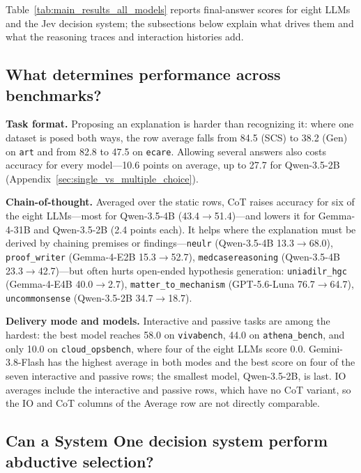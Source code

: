 \label{sec:experiments}
\label{sec:results}

\graphicspath{{prism-uploads/}{figures/}{./}}

Table~\ref{tab:main_results_all_models} reports final-answer scores for eight LLMs and the Jev decision system; the subsections below explain what drives them and what the reasoning traces and interaction histories add.

\subsection{What determines performance across benchmarks?}
\label{sec:main_results}

\textbf{Task format.} Proposing an explanation is harder than recognizing it: where one dataset is posed both ways, the row average falls from 84.5 (SCS) to 38.2 (Gen) on \texttt{art} and from 82.8 to 47.5 on \texttt{ecare}. Allowing several answers also costs accuracy for every model---10.6 points on average, up to 27.7 for Qwen-3.5-2B (Appendix~\ref{sec:single_vs_multiple_choice}).

\textbf{Chain-of-thought.} Averaged over the static rows, CoT raises accuracy for six of the eight LLMs---most for Qwen-3.5-4B (43.4$\to$51.4)---and lowers it for Gemma-4-31B and Qwen-3.5-2B (2.4 points each). It helps where the explanation must be derived by chaining premises or findings---\texttt{neulr} (Qwen-3.5-4B 13.3$\to$68.0), \texttt{proof\_writer} (Gemma-4-E2B 15.3$\to$52.7), \texttt{medcasereasoning} (Qwen-3.5-4B 23.3$\to$42.7)---but often hurts open-ended hypothesis generation: \texttt{uniadilr\_hgc} (Gemma-4-E4B 40.0$\to$2.7), \texttt{matter\_to\_mechanism} (GPT-5.6-Luna 76.7$\to$64.7), \texttt{uncommonsense} (Qwen-3.5-2B 34.7$\to$18.7).

\textbf{Delivery mode and models.} Interactive and passive tasks are among the hardest: the best model reaches 58.0 on \texttt{vivabench}, 44.0 on \texttt{athena\_bench}, and only 10.0 on \texttt{cloud\_opsbench}, where four of the eight LLMs score 0.0. Gemini-3.8-Flash has the highest average in both modes and the best score on four of the seven interactive and passive rows; the smallest model, Qwen-3.5-2B, is last. IO averages include the interactive and passive rows, which have no CoT variant, so the IO and CoT columns of the Average row are not directly comparable.

\subsection{Can a System One decision system perform abductive selection?}
\label{sec:jev}

